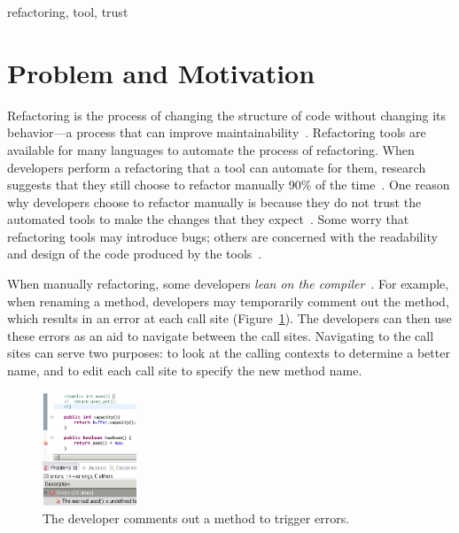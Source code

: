 \documentclass{sigplanconf}
\begin{document}

\keywords
refactoring, tool, trust


\section{Problem and Motivation}
Refactoring is the process of changing the structure of code without changing
its behavior---a process that can improve
maintainability~\cite{maintainability}.
Refactoring tools are available for many languages to automate the process of
refactoring. When developers perform a refactoring that a tool can automate for
them, research suggests that they still choose to refactor manually 90\% of the
time~\cite{how-refactor}. One reason why developers choose to refactor
manually is because they do not
trust the automated tools to make the changes
that they expect~\cite{how-refactor, say-refactor}. 
Some worry that refactoring tools may introduce bugs; others
are concerned with the readability and design of the code produced by the
tools~\cite{say-refactor}.

When manually refactoring, some developers
\textit{lean on the compiler}~\cite{legacy-code, how-refactor}.
For example, when renaming a method, developers may temporarily comment
out the method, which results
in an error at each call site (Figure~\ref{comment}). The developers can then
use these errors as an aid to navigate between the call sites.
Navigating to the call sites can serve two purposes: to look at the calling
contexts to determine a better name, and to edit each call site to specify
the new method name.

\begin{figure}[h]
\begin{center}
\includegraphics[width=0.25\textwidth]{comment.png}
\caption{The developer comments out a method to trigger errors.\label{comment}}
\end{center}
\end{figure}
\end{document}
